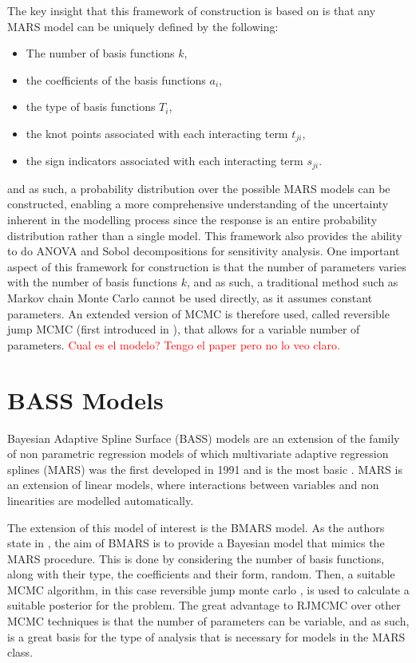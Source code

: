 The key insight that this framework of construction is based on is that any MARS model can be uniquely defined by the following: 
\begin{itemize}
	\item The number of basis functions $k$, 
	\item the coefficients of the basis functions $a_i$, 
	\item the type of basis functions $T_i$, 
	\item the knot points associated with each interacting term $t_{ji}$, 
	\item the sign indicators associated with each interacting term $s_{ji}$. 
\end{itemize}
and as such, a probability distribution over the possible MARS models can be constructed, enabling a more comprehensive understanding of the uncertainty inherent in the modelling process since the response is an entire probability distribution rather than a single model. This framework also provides the ability to do ANOVA and Sobol decompositions for sensitivity analysis. One important aspect of this framework for construction is that the number of parameters varies with the number of basis functions $k$, and as such, a traditional method such as Markov chain Monte Carlo cannot be used directly, as it assumes constant parameters. An extended version of MCMC is therefore used, called reversible jump MCMC (first introduced in \cite{green1995reversible}), that allows for a variable number of parameters. \textcolor{red}{Cual es el modelo? Tengo el paper pero no lo veo claro.}

\section{BASS Models}

Bayesian Adaptive Spline Surface (BASS) models are an extension of the family of non parametric regression models of which multivariate adaptive regression splines (MARS) was the first developed in 1991 and is the most basic \cite{friedman1991multivariate}. MARS is an extension of linear models, where interactions between variables and non linearities are modelled automatically. 

The extension of this model of interest is the BMARS model. As the authors state in \cite{denison1998bayesian}, the aim of BMARS is to provide a Bayesian model that mimics the MARS procedure. This is done by considering the number of basis functions, along with their type, the coefficients and their form, random. Then, a suitable MCMC algorithm, in this case reversible jump monte carlo \cite{green1995reversible}, is used to calculate a suitable posterior for the problem. The great advantage to RJMCMC over other MCMC techniques is that the number of parameters can be variable, and as such, is a great basis for the type of analysis that is necessary for models in the MARS class. 


